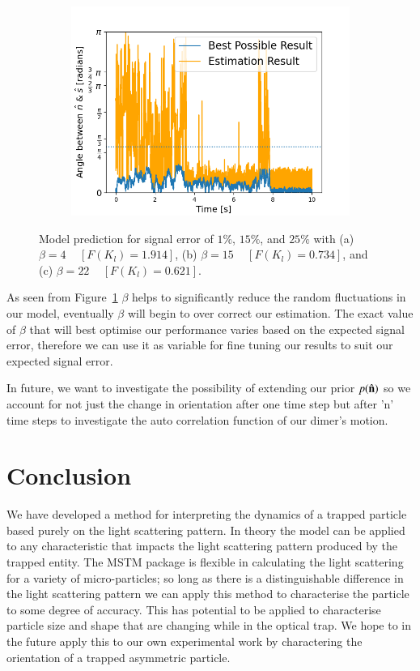 \documentclass[final,  3p]{elsarticle}
\begin{document}
\begin{figure}[h]
\begin{subfigure}{0.32\textwidth}
		\includegraphics[width=\textwidth]{./Images/fig7c.png}
	\end{subfigure}
	\caption{Model prediction for signal error of $1\%$, $15\%$, and $25\%$ with (a) $\beta=4$ ~ $[F(K_l)=1.914]$, (b) $\beta=15$ ~  $[F(K_l)=0.734]$, and (c) $\beta=22$ ~ $[F(K_l)=0.621]$.} 
	\label{fig:beta}
\end{figure}

As seen from Figure~\ref{fig:beta} $\beta$ helps to significantly reduce the random fluctuations in our model, eventually $\beta$ will begin to over correct our estimation. The exact value of $\beta$ that will best optimise our performance varies based on the expected signal error, therefore we can use it as variable for fine tuning our results to suit our expected signal error. 

In future, we want to investigate the possibility of extending our prior $p(\hat{\bf n})$ so we account for not just the change in orientation after one time step but after 'n' time steps to investigate the auto correlation function of our dimer's motion.

\section{Conclusion}
\label{sec:Conclusion}

We have developed a method for interpreting the dynamics of a trapped particle based purely on the light scattering pattern. In theory the model can be applied to any characteristic that impacts the light scattering pattern produced by the trapped entity. The MSTM package is flexible in calculating the light scattering for a variety of micro-particles; so long as there is a distinguishable difference in the light scattering pattern we can apply this method to characterise the particle to some degree of accuracy. This has potential to be applied to characterise particle size and shape that are changing while in the optical trap. We hope to in the future apply this to our own experimental work by charactering the orientation of a trapped asymmetric particle.
\end{document}
